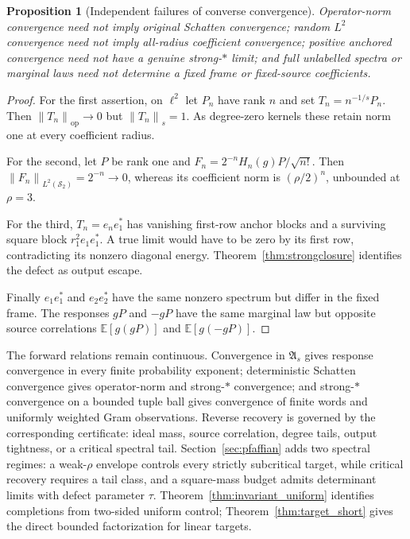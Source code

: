 \documentclass[11pt,a4paper]{amsart}
\numberwithin{equation}{section}
\newtheorem{proposition}[theorem]{Proposition}
\theoremstyle{definition}
\theoremstyle{remark}
\newcommand{\E}{\mathbb E}
\newcommand{\Sch}{\mathcal S}
\newcommand{\Alg}{\mathfrak A}
\newcommand{\op}{\mathrm{op}}
\newcommand{\norm}[1]{\left\lVert#1\right\rVert}
\begin{document}
\begin{proposition}[Independent failures of converse convergence]\label{prop:completionseparation}
Operator-norm convergence need not imply original Schatten convergence; random $L^2$ convergence need not imply all-radius coefficient convergence; positive anchored convergence need not have a genuine strong-$*$ limit; and full unlabelled spectra or marginal laws need not determine a fixed frame or fixed-source coefficients.
\end{proposition}
\begin{proof}
For the first assertion, on $\ell^2$ let $P_n$ have rank $n$ and set $T_n=n^{-1/s}P_n$. Then $\norm{T_n}_{\op}\to0$ but $\norm{T_n}_s=1$. As degree-zero kernels these retain norm one at every coefficient radius.

For the second, let $P$ be rank one and
$F_n=2^{-n}H_n(g)P/\sqrt{n!}$.
Then $\norm{F_n}_{L^2(\Sch_2)}=2^{-n}\to0$, whereas its coefficient norm is $(\rho/2)^n$, unbounded at $\rho=3$.

For the third, $T_n=e_ne_1^*$ has vanishing first-row anchor blocks and a surviving square block $r_1^2e_1e_1^*$. A true limit would have to be zero by its first row, contradicting its nonzero diagonal energy. Theorem~\ref{thm:strongclosure} identifies the defect as output escape.

Finally $e_1e_1^*$ and $e_2e_2^*$ have the same nonzero spectrum but differ in the fixed frame. The responses $gP$ and $-gP$ have the same marginal law but opposite source correlations $\E[g(gP)]$ and $\E[g(-gP)]$.
\end{proof}

The forward relations remain continuous. Convergence in $\Alg_s$ gives response convergence in every finite probability exponent; deterministic Schatten convergence gives operator-norm and strong-$*$ convergence; and strong-$*$ convergence on a bounded tuple ball gives convergence of finite words and uniformly weighted Gram observations. Reverse recovery is governed by the corresponding certificate: ideal mass, source correlation, degree tails, output tightness, or a critical spectral tail. Section~\ref{sec:pfaffian} adds two spectral regimes: a weak-$\rho$ envelope controls every strictly subcritical target, while critical recovery requires a tail class, and a square-mass budget admits determinant limits with defect parameter $\tau$. Theorem~\ref{thm:invariant_uniform} identifies completions from two-sided uniform control; Theorem~\ref{thm:target_short} gives the direct bounded factorization for linear targets.
\end{document}

